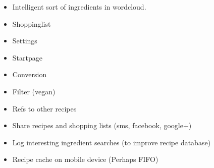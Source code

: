 \begin{itemize}
\item Intelligent sort of ingredients in wordcloud.
\item Shoppinglist
\item Settings
\item Startpage
\item Conversion
\item Filter (vegan)
\item Refs to other recipes
\item Share recipes and shopping lists (sms, facebook, google+)
\item Log interesting ingredient searches (to improve recipe database)
\item Recipe cache on mobile device (Perhaps FIFO)
\end{itemize}